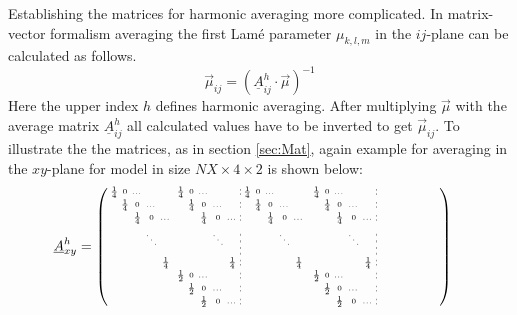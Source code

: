 \documentclass[pdftex,a4paper,parskip,listof=totoc,bibliography=totoc,onehalfspacing,12pt]{scrreprt}
\newcommand*\dashline{\hspace{-0.3em}\rotatebox[origin=c]{90}{\scalebox{-0.3}[1]{$-~~-$}}\hspace{-0.3em}}
\newcommand*\longdashline{\hspace{-0.3em}\rotatebox[origin=c]{90}{\scalebox{-0.4}[1]{$-~~-~~-~~-$}}\hspace{-0.3em}}
\begin{document}
Establishing the matrices for harmonic averaging more complicated. In matrix-vector formalism averaging the first Lam\'{e} parameter $\mu_{k,l,m}$ in the $ij$-plane can be calculated as follows.
\begin{equation*}
\vec{\mu}_{ij}=\left(\underline{A}^{h}_{ij} \cdot\vec{\mu}	\right)^{-1}
\end{equation*}
Here the upper index $h$ defines harmonic averaging. After multiplying $\vec{\mu}$ with the average matrix $\underline{A}^{h}_{ij}$ all calculated values have to be inverted to get $\vec{\mu}_{ij}$.
To illustrate the the matrices, as in section \ref{sec:Mat}, again example for averaging in the $xy$-plane for model in size $NX\times 4 \times 2$ is shown below: 
\begin{align*}
	\underline{A}^{h}_{xy} &= \tiny\begin{psmallmatrix}
	\frac{1}{4} & 0 & \dots   & &   &&  \frac{1}{4} & 0 & \dots   & &   &\dashline&  \frac{1}{4} & 0 & \dots   & &   &&  & \frac{1}{4} & 0 & \dots & & &\dashline& & & && & & & & && & & && & && & & & & \\
  	& \frac{1}{4} & 0 & \dots &   &&   & \frac{1}{4} & 0 & \dots &   &\dashline&   & \frac{1}{4} & 0 & \dots &   &&   & & \frac{1}{4} & 0 & \dots & &\dashline  & & & && & & & & && && & & & && & & & & \\
    & & \frac{1}{4} & 0 & \dots    &&  &  & \frac{1}{4} & 0 & \dots    &\dashline&   & & \frac{1}{4} & 0 & \dots   &&  &  &  & \frac{1}{4} & 0 & \dots &\dashline & & & && & & & & && & && & & && & & & & \\
   	& &  & \ddots &     &&  &  & & \ddots &   &\longdashline& &   & &  \ddots &  &    &&  &  & & \ddots &   &\longdashline& & & & && & & & & &&& & & & & && & & & & \\
    & & & & \frac{1}{4} &&  & & & & \frac{1}{4} &\dashline& & & & & \frac{1}{4} && & & & & & \frac{1}{4}  &\dashline & & & &&& & & & & && & & & & && & & & & \\
    &   &     & &   &&  \frac{1}{2} & 0 & \dots   & &   &\dashline&    &   &     & &   &&  & \frac{1}{2} & 0 & \dots & &   & \dashline& & && && & & & & && & & & & && & & & & \\
 	& &   &  &   &&   & \frac{1}{2} & 0 & \dots &   &\dashline&   &   &   &   &   &&   & & \frac{1}{2} & 0 & \dots && \dashline& & & && && & & & && & & & & && & & & & \\
   	& &   &   &      &&  &  & \frac{1}{2} & 0 & \dots    &\dashline&   & &   &   &     &&  &  &  & \frac{1}{2} & 0 & \dots&\dashline & & && && & & & & && & & & & && & & & & \\

\end{psmallmatrix}
\end{align*}
\end{document}

